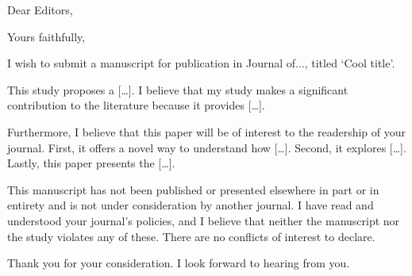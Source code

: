 \documentclass[12pt,a4paper]{moderncv}
\begin{document}
\onehalfspacing

\date{\today}
\opening{Dear Editors,}
\closing{Yours faithfully,}
\makelettertitle

\justify

I wish to submit a manuscript for publication in Journal of..., titled `Cool title'. 

This study proposes a [\dots]. I believe that my study makes a significant contribution to the literature because it provides [\dots].

Furthermore, I believe that this paper will be of interest to the readership of your journal. First, it offers a novel way to understand how [\dots]. Second, it explores [\dots]. Lastly, this paper presents the [\dots].

This manuscript has not been published or presented elsewhere in part or in entirety and is not under consideration by another journal. I have read and understood your journal's policies, and I believe that neither the manuscript nor the study violates any of these. There are no conflicts of interest to declare.

Thank you for your consideration. I look forward to hearing from you.

\vspace{1cm}
\makeletterclosing
\end{document}
